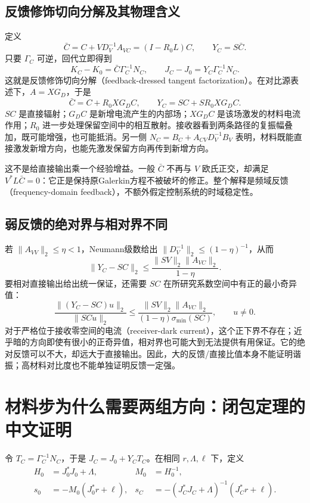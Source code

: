 \subsection{反馈修饰切向分解及其物理含义}
定义
\begin{equation}
 \bar C=C+VD_V^{-1}A_{VC}=(I-R_0L)C,\qquad Y_C=S\bar C.
\end{equation}
只要 $\Gamma_C$ 可逆，回代立即得到
\begin{equation}\label{zh:tangent}
 \boxed{K_C-K_0=\bar C\Gamma_C^{-1}N_C,\qquad
 J_C-J_0=Y_C\Gamma_C^{-1}N_C.}
\end{equation}
这就是反馈修饰切向分解（feedback-dressed tangent factorization）。在对比源表述下，$A=XG_D$，于是
\begin{equation}
 \bar C=C+R_0XG_DC,\qquad Y_C=SC+SR_0XG_DC.
\end{equation}
$SC$ 是直接辐射；$G_DC$ 是新增电流产生的内部场；$XG_DC$ 是该场激发的材料电流作用；$R_0$ 进一步处理保留空间中的相互散射。接收器看到两条路径的复振幅叠加，既可能增强，也可能抵消。另一侧 $N_C=B_C+A_{CV}D_V^{-1}B_V$ 表明，材料既能直接激发新增方向，也能先激发保留方向再传到新增方向。

这不是给直接输出乘一个经验增益。一般 $\bar C$ 不再与 $V$ 欧氏正交，却满足 $V^*L\bar C=0$：它正是保持原Galerkin方程不被破坏的修正。整个解释是频域反馈（frequency-domain feedback），不额外假定控制系统的时域稳定性。

\subsection{弱反馈的绝对界与相对界不同}
若 $\|A_{VV}\|_2\le\eta<1$，Neumann级数给出 $\|D_V^{-1}\|_2\le(1-\eta)^{-1}$，从而
\begin{equation}
 \|Y_C-SC\|_2\le\frac{\|SV\|_2\|A_{VC}\|_2}{1-\eta}.
\end{equation}
要相对直接输出给出统一保证，还需要 $SC$ 在所研究系数空间中有正的最小奇异值：
\begin{equation}
 \frac{\|(Y_C-SC)u\|_2}{\|SCu\|_2}
 \le\frac{\|SV\|_2\|A_{VC}\|_2}
 {(1-\eta)\sigma_{\min}(SC)},\qquad u\ne0.
\end{equation}
对于严格位于接收零空间的电流（receiver-dark current），这个正下界不存在；近乎暗的方向即使有很小的正奇异值，相对界也可能大到无法提供有用保证。它的绝对反馈可以不大，却远大于直接输出。因此，大的反馈/直接比值本身不能证明谐振；高材料对比度也不能单独证明反馈一定强。

\section{材料步为什么需要两组方向：闭包定理的中文证明}
令 $T_C=\Gamma_C^{-1}N_C$，于是 $J_C=J_0+Y_CT_C$。在相同 $r,\Lambda,\ell$ 下，定义
\begin{equation}
 \begin{aligned}
 H_0&=J_0^*J_0+\Lambda,& M_0&=H_0^{-1},\\
 s_0&=-M_0(J_0^*r+\ell),&
 s_C&=-(J_C^*J_C+\Lambda)^{-1}(J_C^*r+\ell).
 \end{aligned}
\end{equation}
